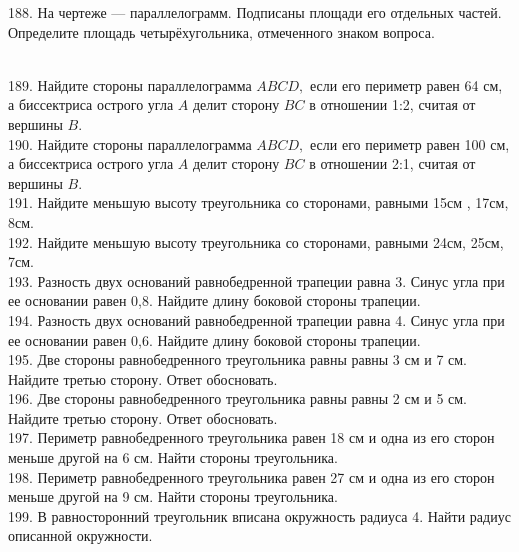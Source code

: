 \documentclass[12pt]{article}
\begin{document}
188. На чертеже --- параллелограмм. Подписаны площади его отдельных частей. Определите площадь четырёхугольника, отмеченного знаком вопроса.
\begin{figure}[ht!]
\end{figure}\\
189. Найдите стороны параллелограмма $ABCD,$ если его периметр равен 64 см, а биссектриса острого угла $A$ делит сторону $BC$ в отношении 1:2, считая от вершины $B.$\\
190. Найдите стороны параллелограмма $ABCD,$ если его периметр равен 100 см, а биссектриса острого угла $A$ делит сторону $BC$ в отношении 2:1, считая от вершины $B.$\\
191. Найдите меньшую высоту треугольника со сторонами, равными 15см , 17см, 8см.\\
192. Найдите меньшую высоту треугольника со сторонами, равными 24см, 25см, 7см.\\
193. Разность двух оснований равнобедренной трапеции равна 3. Синус угла при ее основании равен 0,8. Найдите длину боковой стороны трапеции.\\
194. Разность двух оснований равнобедренной трапеции равна 4. Синус угла при ее основании равен 0,6. Найдите длину боковой стороны трапеции.\\
195. Две стороны равнобедренного треугольника равны равны 3 см и 7 см. Найдите третью сторону. Ответ обосновать.\\
196. Две стороны равнобедренного треугольника равны равны 2 см и 5 см. Найдите третью сторону. Ответ обосновать.\\
197. Периметр равнобедренного треугольника равен 18 см и одна из его сторон меньше другой на 6 см. Найти стороны треугольника.\\
198. Периметр равнобедренного треугольника равен 27 см и одна из его сторон меньше другой на 9 см. Найти стороны треугольника.\\
199. В равносторонний треугольник вписана окружность радиуса 4. Найти радиус описанной окружности.\\
\end{document}
